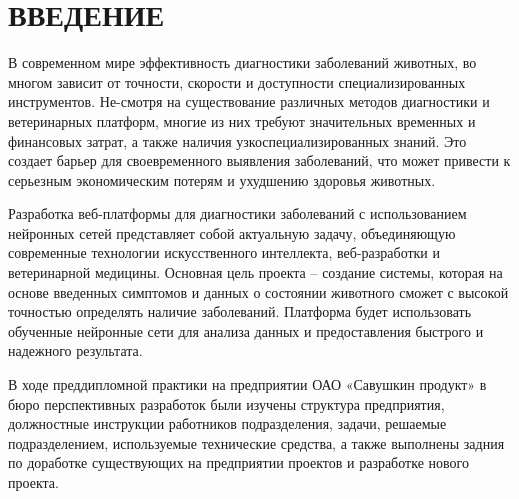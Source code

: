\sectionbreak \section*{ 
    \gostTitleFont
    \redline
    ВВЕДЕНИЕ
}

\subtitlespace

{\gostFont

\par \redline В современном мире эффективность диагностики заболеваний животных, во многом зависит от точности, скорости и доступности специализированных инструментов. Не-смотря на существование различных методов диагностики и ветеринарных платформ, многие из них требуют значительных временных и финансовых затрат, а также наличия узкоспециализированных знаний. Это создает барьер для своевременного выявления заболеваний, что может привести к серьезным экономическим потерям и ухудшению здоровья животных.

\par \redline Разработка веб-платформы для диагностики заболеваний с использованием нейронных сетей представляет собой актуальную задачу, объединяющую современные технологии искусственного интеллекта, веб-разработки и ветеринарной медицины. Основная цель проекта – создание системы, которая на основе введенных симптомов и данных о состоянии животного сможет с высокой точностью определять наличие заболеваний. Платформа будет использовать обученные нейронные сети для анализа данных и предоставления быстрого и надежного результата.

\par \redline  В ходе преддипломной практики на предприятии ОАО «Савушкин продукт» в бюро перспективных разработок были изучены структура предприятия, должностные инструкции работников подразделения, задачи, решаемые подразделением, используемые технические средства, а также выполнены задния по доработке существующих на предприятии проектов и разработке нового проекта.

\par
}
